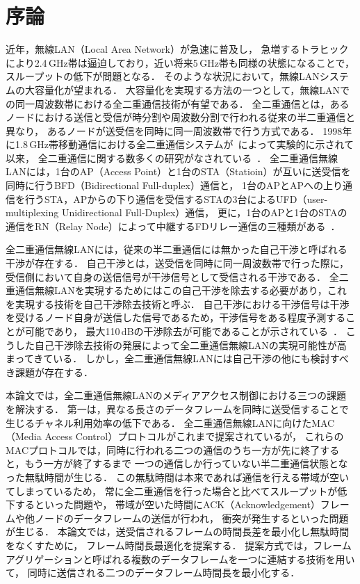 \documentclass[master]{kuisthesis}		%
\begin{document}
\section{序論} \label{sec:intro}
近年，無線LAN（Local Area Network）が急速に普及し，
急増するトラヒックにより2.4\,GHz帯は逼迫しており，近い将来5\,GHz帯も同様の状態になることで，
スループットの低下が問題となる．
そのような状況において，無線LANシステムの大容量化が望まれる．
大容量化を実現する方法の一つとして，無線LANでの同一周波数帯における全二重通信技術が有望である．
全二重通信とは，あるノードにおける送信と受信が時分割や周波数分割で行われる従来の半二重通信と異なり，
あるノードが送受信を同時に同一周波数帯で行う方式である．
1998年に1.8\,GHz帯移動通信における全二重通信システムが~\cite{fdstart}によって実験的に示されて以来，
全二重通信に関する数多くの研究がなされている~\cite{adhocfd,achifd,realtimefd,asynfd,baifd}．
全二重通信無線LANには，1台のAP（Access Point）と1台のSTA（Statioin）が互いに送受信を同時に行うBFD（Bidirectional Full-duplex）通信と，
1台のAPとAPへの上り通信を行うSTA，APからの下り通信を受信するSTAの3台によるUFD（user-multiplexing Unidirectional Full-Duplex）通信，
更に，1台のAPと1台のSTAの通信をRN（Relay Node）によって中継するFDリレー通信の三種類がある~\cite{fdsurvey}．
\par
全二重通信無線LANには，従来の半二重通信には無かった自己干渉と呼ばれる干渉が存在する．
自己干渉とは，送受信を同時に同一周波数帯で行った際に，
受信側において自身の送信信号が干渉信号として受信される干渉である．
全二重通信無線LANを実現するためにはこの自己干渉を除去する必要があり，これを実現する技術を自己干渉除去技術と呼ぶ．
自己干渉における干渉信号は干渉を受けるノード自身が送信した信号であるため，干渉信号をある程度予測することが可能であり，
最大110\,dBの干渉除去が可能であることが示されている~\cite{stanford1,fdmac}．
こうした自己干渉除去技術の発展によって全二重通信無線LANの実現可能性が高まってきている．
しかし，全二重通信無線LANには自己干渉の他にも検討すべき課題が存在する．

\par
本論文では，全二重通信無線LANのメディアアクセス制御における三つの課題を解決する．
第一は，異なる長さのデータフレームを同時に送受信することで生じるチャネル利用効率の低下である．
全二重通信無線LANに向けたMAC（Media Access Control）プロトコル\cite{fdmac,contra,janus}がこれまで提案されているが，
これらのMACプロトコルでは，同時に行われる二つの通信のうち一方が先に終了すると，もう一方が終了するまで
一つの通信しか行っていない半二重通信状態となった無駄時間が生じる．
この無駄時間は本来であれば通信を行える帯域が空いてしまっているため，
常に全二重通信を行った場合と比べてスループットが低下するといった問題や，
帯域が空いた時間にACK（Acknowledgement）フレームや他ノードのデータフレームの送信が行われ，
衝突が発生するといった問題が生じる．
本論文では，送受信されるフレームの時間長差を最小化し無駄時間をなくすために，
フレーム時間長最適化を提案する．
提案方式では，フレームアグリゲーションと呼ばれる複数のデータフレームを一つに連結する技術を用いて，
同時に送信される二つのデータフレーム時間長を最小化する．
\end{document}
